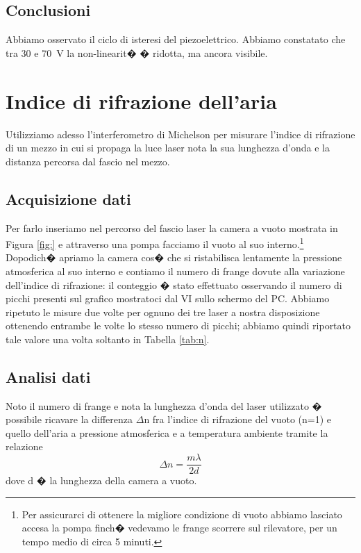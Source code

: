 \documentclass[a4paper]{article}
\begin{document}
 \begin{multicols}{2}

\subsection{Conclusioni}
Abbiamo osservato il ciclo di isteresi del piezoelettrico. Abbiamo constatato che tra 30 e 70~V la non-linearit� � ridotta, ma ancora visibile. 

\section{Indice di rifrazione dell'aria}

Utilizziamo adesso l'interferometro di Michelson per misurare l'indice di rifrazione di un mezzo in cui si propaga la luce laser nota la sua lunghezza d'onda e la distanza percorsa dal fascio nel mezzo. 

\subsection{Acquisizione dati}
Per farlo inseriamo nel percorso del fascio laser la camera a vuoto mostrata in Figura \ref{fig:} e attraverso una pompa facciamo il vuoto al suo interno.\footnote{Per assicurarci di ottenere la migliore condizione di vuoto abbiamo lasciato accesa la pompa finch� vedevamo le frange scorrere sul rilevatore, per un tempo medio di circa 5 minuti.} 
Dopodich� apriamo la camera cos� che si ristabilisca lentamente la pressione atmosferica al suo interno e contiamo il numero di frange dovute alla variazione dell'indice di rifrazione: il conteggio � stato effettuato osservando il numero di picchi presenti sul grafico mostratoci dal VI sullo schermo del PC. Abbiamo ripetuto le misure due volte per ognuno dei tre laser a nostra disposizione ottenendo entrambe le volte lo stesso numero di picchi; abbiamo quindi riportato tale valore una volta soltanto in Tabella \ref{tab:n}.

\subsection{Analisi dati}
Noto il numero di frange e nota la lunghezza d'onda del laser utilizzato � possibile ricavare la differenza $\Delta$n fra l'indice di rifrazione del vuoto (n=1) e quello dell'aria a pressione atmosferica e a temperatura ambiente tramite la relazione
\begin{equation}
\Delta n = \frac{m\lambda}{2d}
\end{equation}
dove d � la lunghezza della camera a vuoto.


\end{multicols}
\end{document}
